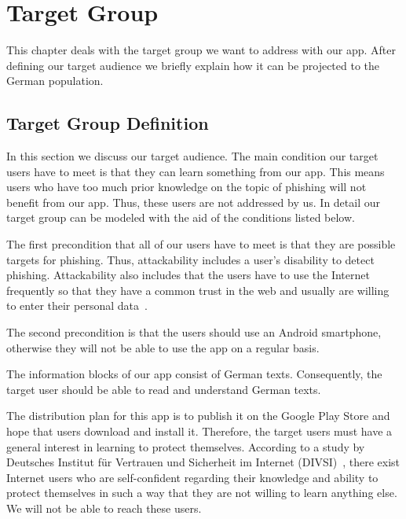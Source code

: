 \section{Target Group}
\label{s:target_group}
This chapter deals with the target group we want to address with our app.
After defining our target audience we briefly explain how it can be projected to the German population.

\subsection{Target Group Definition}
\label{s:target_group_def}
In this section we discuss our target audience.
The main condition our target users have to meet is that they can learn something from our app.
This means users who have too much prior knowledge on the topic of phishing will not benefit from our app.
Thus, these users are not addressed by us.
In detail our target group can be modeled with the aid of the conditions listed below.
\begin{description}[leftmargin=0cm]
\item[Attackability:] The first precondition that all of our users have to meet is that they are possible targets for phishing.
Thus, attackability includes a user's disability to detect phishing.
Attackability also includes that the users have to use the Internet frequently so that they have a common trust in the web and usually are willing to enter their personal data~\cite{divsi2012divsi}.
\item[Android Users:] The second precondition is that the users should use an Android smartphone, otherwise they will not be able to use the app on a regular basis.
\item[Language:] The information blocks of our app consist of German texts.
Consequently, the target user should be able to read and understand German texts.
\item[Motivation:] The distribution plan for this app is to publish it on the Google Play Store and hope that users download and install it.
Therefore, the target users must have a general interest in learning to protect themselves.
 According to a study by Deutsches Institut f\"{u}r Vertrauen und Sicherheit im Internet (DIVSI)~\cite{divsi2012divsi}, there exist Internet users who are self-confident regarding their knowledge and ability to protect themselves in such a way that they are not willing to learn anything else.
We will not be able to reach these users.
\end{description}

